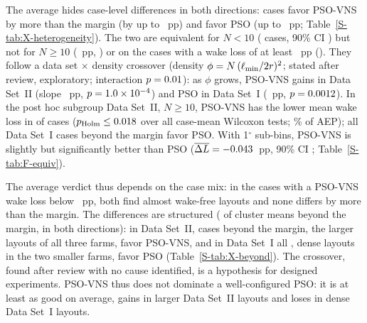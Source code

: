 \begingroup\swResRefs\swResWrapNotes
\endgroup
The average hides case-level differences in both directions: \NXHetBeyondPSOVNS{} cases favor PSO-VNS by more than the margin (by up to \NXHetMaxPSOVNS~pp) and \NXHetBeyondPSO{} favor PSO (up to \NXHetMaxPSO~pp; Table~\ref{S-tab:X-heterogeneity}). The two are equivalent for $N<10$ (\NXEqSmallN{} cases, 90\% CI \NXEqSmallCI) but not for $N\ge10$ (\NXEqLargeMean~pp, \NXEqLargeCI) or on the \NXEqNontrivialN{} cases with a wake loss of at least \NXTrivialLoss~pp (\NXEqNontrivialCI). They follow a data set $\times$ density crossover (density $\phi=N\,(\ell_{\min}/2r)^2$; stated after review, exploratory; interaction $p=0.01$): as $\phi$ grows, PSO-VNS gains in Data Set~II (slope \NXDensSlopeDsII~pp, $p=1.0\times10^{-4}$) and PSO in Data Set~I (\NXDensSlopeDsI~pp, $p=0.0012$). In the post hoc subgroup Data Set~II, $N\ge10$, PSO-VNS has the lower mean wake loss in \NCmPSOVNSvsPSOdsIILargeWins{} of \NCmPSOVNSvsPSOdsIILargeN{} cases ($p_{\rm Holm}\le0.018$ over all \NXMultN{} case-mean Wilcoxon tests; \NXEnPSOVNSvsPSOdsIILargePct\% of AEP); all \NXHetDsINPSO{} Data Set~I cases beyond the margin favor PSO. With 1$^\circ$ sub-bins, PSO-VNS is slightly but significantly better than PSO ($\overline{\Delta L}=-0.043$~pp, 90\% CI \NFPairCIOne; Table~\ref{S-tab:F-equiv}).

The average verdict thus depends on the case mix: in the \NXEqTrivialN{} cases with a PSO-VNS wake loss below \NXTrivialLoss~pp, both find almost wake-free layouts and none differs by more than the margin. The differences are structured (\NXHetClBeyond{} of \NXClustersNum{} cluster means beyond the margin, in both directions): in Data Set~II, \NXHetDsIINPSOVNS{} cases beyond the margin, the larger layouts of all three farms, favor PSO-VNS, and in Data Set~I all \NXHetDsINPSO{}, dense layouts in the two smaller farms, favor PSO (Table~\ref{S-tab:X-beyond}). The crossover, found after review with no cause identified, is a hypothesis for designed experiments. PSO-VNS thus does not dominate a well-configured PSO: it is at least as good on average, gains in larger Data Set~II layouts and loses in dense Data Set~I layouts.
